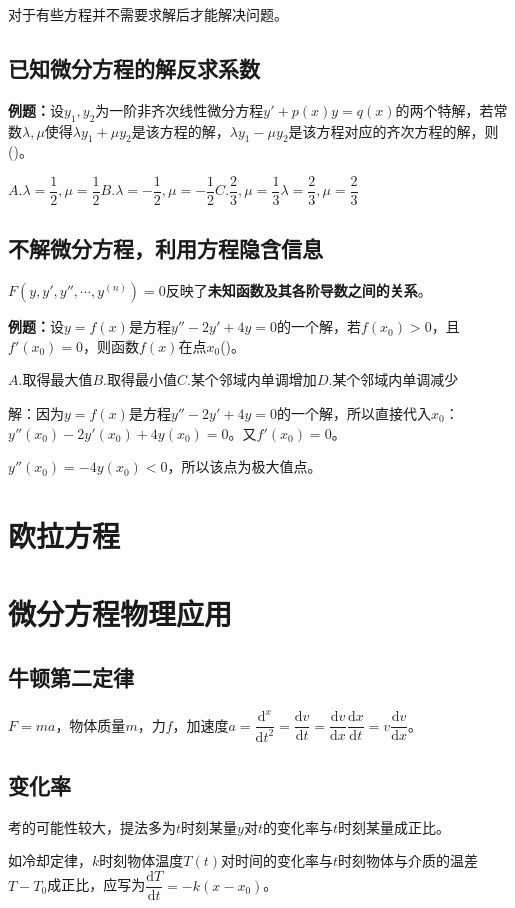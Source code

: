 对于有些方程并不需要求解后才能解决问题。

\subsection{已知微分方程的解反求系数}

\textbf{例题：}设$y_1,y_2$为一阶非齐次线性微分方程$y'+p(x)y=q(x)$的两个特解，若常数$\lambda,\mu$使得$\lambda y_1+\mu y_2$是该方程的解，$\lambda y_1-\mu y_2$是该方程对应的齐次方程的解，则()。

$A.\lambda=\dfrac{1}{2},\mu=\dfrac{1}{2}$\qquad$B.\lambda=-\dfrac{1}{2},\mu=-\dfrac{1}{2}$\qquad$C.\dfrac{2}{3},\mu=\dfrac{1}{3}$\qquad$\lambda=\dfrac{2}{3},\mu=\dfrac{2}{3}$

\subsection{不解微分方程，利用方程隐含信息}

$F(y,y',y'',\cdots,y^{(n)})=0$反映了\textbf{未知函数及其各阶导数之间的关系}。

\textbf{例题：}设$y=f(x)$是方程$y''-2y'+4y=0$的一个解，若$f(x_0)>0$，且$f'(x_0)=0$，则函数$f(x)$在点$x_0$()。

$A.$取得最大值\qquad$B.$取得最小值\qquad$C.$某个邻域内单调增加\qquad$D.$某个邻域内单调减少

解：因为$y=f(x)$是方程$y''-2y'+4y=0$的一个解，所以直接代入$x_0$：$y''(x_0)-2y'(x_0)+4y(x_0)=0$。又$f'(x_0)=0$。

$y''(x_0)=-4y(x_0)<0$，所以该点为极大值点。

\section{欧拉方程}

\section{微分方程物理应用}

\subsection{牛顿第二定律}

$F=ma$，物体质量$m$，力$f$，加速度$a=\dfrac{\textrm{d}^x}{\textrm{d}t^2}=\dfrac{\textrm{d}v}{\textrm{d}t}=\dfrac{\textrm{d}v}{\textrm{d}x}\dfrac{\textrm{d}x}{\textrm{d}t}=v\dfrac{\textrm{d}v}{\textrm{d}x}$。

\subsection{变化率}

考的可能性较大，提法多为$t$时刻某量$y$对$t$的变化率与$t$时刻某量成正比。

如冷却定律，$k$时刻物体温度$T(t)$对时间的变化率与$t$时刻物体与介质的温差$T-T_0$成正比，应写为$\dfrac{\textrm{d}T}{\textrm{d}t}=-k(x-x_0)$。

%
